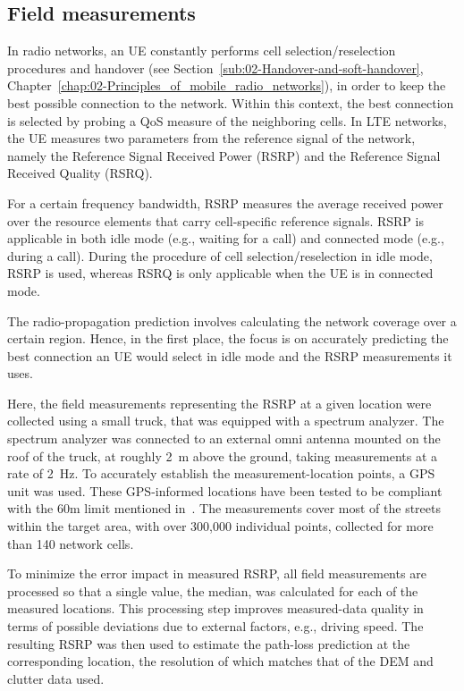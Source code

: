 \subsection{Field measurements}

In radio networks, an UE constantly performs cell selection/reselection
procedures and handover (see Section~\ref{sub:02-Handover-and-soft-handover},
Chapter~\ref{chap:02-Principles_of_mobile_radio_networks}), in order
to keep the best possible connection to the network. Within this context,
the best connection is selected by probing a QoS measure of the neighboring
cells. In LTE networks, the UE measures two parameters from the reference
signal of the network, namely the Reference Signal Received Power
(RSRP) and the Reference Signal Received Quality (RSRQ).

For a certain frequency bandwidth, RSRP measures the average received
power over the resource elements that carry cell-specific reference
signals. RSRP is applicable in both idle mode (e.g., waiting for a
call) and connected mode (e.g., during a call). During the procedure
of cell selection/reselection in idle mode, RSRP is used, whereas
RSRQ is only applicable when the UE is in connected mode. 

The radio-propagation prediction involves calculating the network
coverage over a certain region. Hence, in the first place, the focus
is on accurately predicting the best connection an UE would select
in idle mode and the RSRP measurements it uses.

Here, the field measurements representing the RSRP at a given location
were collected using a small truck, that was equipped with a spectrum
analyzer. The spectrum analyzer was connected to an external omni
antenna mounted on the roof of the truck, at roughly 2~m above the
ground, taking measurements at a rate of 2~Hz. To accurately establish
the measurement-location points, a GPS unit was used. These GPS-informed
locations have been tested to be compliant with the 60m limit mentioned
in~\cite{Aarnaes-Tuning_of_empirical_radio_propagation_models_effect_of_location_accuracy:2004}.
The measurements cover most of the streets within the target area,
with over 300,000 individual points, collected for more than 140 network
cells.

To minimize the error impact in measured RSRP, all field measurements
are processed so that a single value, the median, was calculated for
each of the measured locations. This processing step improves measured-data
quality in terms of possible deviations due to external factors, e.g.,
driving speed. The resulting RSRP was then used to estimate the path-loss
prediction at the corresponding location, the resolution of which
matches that of the DEM and clutter data used.


